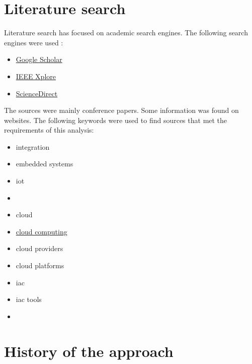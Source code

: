 \section{Literature search}

Literature search has focused on academic search engines. The following search engines were used :
\begin{itemize}
    \item \href{https://scholar.google.com}{Google Scholar}
    \item \href{https://ieeexplore.ieee.org/Xplore/home.jsp}{IEEE Xplore}
    \item \href{https://www.sciencedirect.com}{ScienceDirect}
\end{itemize}
The sources were mainly conference papers. Some information was found on websites. The following keywords were used to find sources that met the requirements of this analysis:
\begin{itemize}
    \item integration
    \item embedded systems
    \item \acrshort{iot}
    \item {}
    \item \gls{cloud}
    \item \hyperref[subsec:cloudcomputing]{cloud computing}
    \item \gls{cloud} providers
    \item \gls{cloud} platforms
    \item \acrlong{iac}
    \item \acrshort{iac} tools
    \item {}
\end{itemize}


\section{History of the \texorpdfstring{}{} approach}

